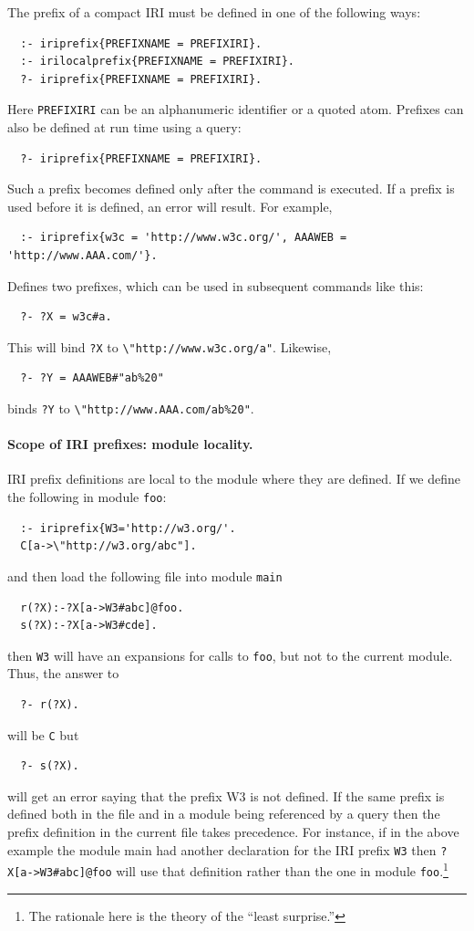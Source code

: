 \documentclass[11pt]{article}
\newcommand{\bs}{\textbackslash}
\begin{document}
The prefix of a compact IRI must be defined in one of the following ways:
\begin{verbatim}
  :- iriprefix{PREFIXNAME = PREFIXIRI}. 
  :- irilocalprefix{PREFIXNAME = PREFIXIRI}. 
  ?- iriprefix{PREFIXNAME = PREFIXIRI}. 
\end{verbatim}
Here {\tt PREFIXIRI}  can be an alphanumeric identifier or a
quoted atom. Prefixes can also be defined at run time using a query:
\begin{verbatim}
  ?- iriprefix{PREFIXNAME = PREFIXIRI}. 
\end{verbatim}
Such a prefix becomes defined only after the command is executed.
If a prefix is used before it is defined, an error will result.
For example,
\begin{verbatim}
  :- iriprefix{w3c = 'http://www.w3c.org/', AAAWEB = 'http://www.AAA.com/'}. 
\end{verbatim}
Defines two prefixes, which can be used in subsequent commands like this:
\begin{verbatim}
  ?- ?X = w3c#a.
\end{verbatim}
This will bind {\tt ?X} to   {\tt \bs{}"http://www.w3c.org/a"}. 
Likewise,
\begin{verbatim}
  ?- ?Y = AAAWEB#"ab%20" 
\end{verbatim}
binds {\tt ?Y} to {\tt \bs{}"http://www.AAA.com/ab\%20"}. 

\paragraph{Scope of IRI prefixes: module locality.}
IRI prefix definitions are local to the module where they are
defined. If we define the following in module {\tt foo}:
\begin{verbatim}
  :- iriprefix{W3='http://w3.org/'.
  C[a->\"http://w3.org/abc"].
\end{verbatim}
and then load the following file into module {\tt main} 
\begin{verbatim}
  r(?X):-?X[a->W3#abc]@foo.
  s(?X):-?X[a->W3#cde].
\end{verbatim}
then  {\tt W3} will have an expansions for calls to \texttt{foo}, but not
to the current module. 
Thus, the answer to
\begin{verbatim}
  ?- r(?X).
\end{verbatim}
will be {\tt C} but
\begin{verbatim}
  ?- s(?X).
\end{verbatim}
will get an error saying that the prefix W3 is not defined.
If the same prefix is defined both in the file and in a module being
referenced by a query then the prefix definition in the current file takes
precedence.
For instance, if in the above example the module main had another
declaration for the IRI prefix \texttt{W3} then \texttt{?X[a->W3\#abc]@foo}
will use that definition rather than the one in module
\texttt{foo}.\footnote{
  The rationale here is the theory of the ``least surprise.''
}
\end{document}
